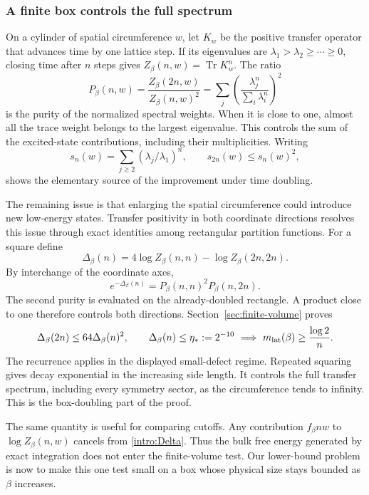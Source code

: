 \subsubsection{A finite box controls the full spectrum}

On a cylinder of spatial circumference $w$, let $K_w$ be the positive
transfer operator that advances time by one lattice step. If its
eigenvalues are $\lambda_1>\lambda_2\ge\cdots\ge0$, closing time after
$n$ steps gives $Z_\beta(n,w)=\operatorname{Tr}K_w^n$. The ratio
\[
 P_\beta(n,w)=\frac{Z_\beta(2n,w)}{Z_\beta(n,w)^2}
 =\sum_j\left(\frac{\lambda_j^n}{\sum_i\lambda_i^n}\right)^2
\]
is the purity of the normalized spectral weights. When it is close to
one, almost all the trace weight belongs to the largest eigenvalue.
This controls the sum of the excited-state contributions, including
their multiplicities. Writing
\[
 s_n(w)=\sum_{j\ge2}(\lambda_j/\lambda_1)^n,
 \qquad s_{2n}(w)\le s_n(w)^2,
\]
shows the elementary source of the improvement under time doubling.

The remaining issue is that enlarging the spatial circumference could
introduce new low-energy states. Transfer positivity in both coordinate
directions resolves this issue through exact identities among
rectangular partition functions. For a square define
\begin{equation}
 \Delta_\beta(n)=4\log Z_\beta(n,n)-\log Z_\beta(2n,2n).
 \label{intro:Delta}
\end{equation}
By interchange of the coordinate axes,
\[
 e^{-\Delta_\beta(n)}=P_\beta(n,n)^2P_\beta(n,2n).
\]
The second purity is evaluated on the already-doubled rectangle.
A product close to one therefore controls both directions.
Section~\ref{sec:finite-volume} proves
\[
 \Delta_\beta(2n)\le64\Delta_\beta(n)^2,
 \qquad
 \Delta_\beta(n)\le\eta_*:=2^{-10}
 \ \Longrightarrow\ m_{\mathrm{lat}}(\beta)\ge\frac{\log2}{n}.
\]
The recurrence applies in the displayed small-defect regime.
Repeated squaring gives decay exponential in the increasing side
length. It controls the full transfer spectrum, including every
symmetry sector, as the circumference tends to infinity.
This is the box-doubling part of the proof.

The same quantity is useful for comparing cutoffs. Any contribution
$f_\beta nw$ to $\log Z_\beta(n,w)$ cancels from
\eqref{intro:Delta}. Thus the bulk free energy generated by exact
integration does not enter the finite-volume test. Our lower-bound
problem is now to make this one test small on a box whose physical
size stays bounded as $\beta$ increases.

